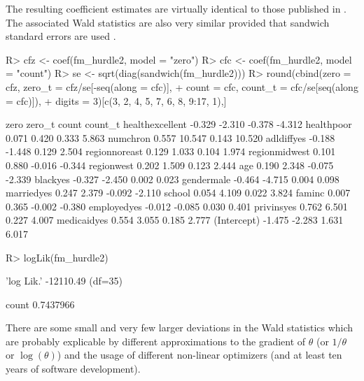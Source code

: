 \documentclass{Z}
\begin{document}
\begin{appendix}
The resulting coefficient estimates are virtually identical to those published
in \citet[p.~204]{countreg:Cameron+Trivedi:1998}. The associated Wald statistics
are also very similar provided that sandwich standard errors are used
\citet[which is not stated explicitely in][]{countreg:Cameron+Trivedi:1998}.
\begin{Schunk}
\begin{Sinput}
R> cfz <- coef(fm_hurdle2, model = "zero")
R> cfc <- coef(fm_hurdle2, model = "count")
R> se <- sqrt(diag(sandwich(fm_hurdle2)))
R> round(cbind(zero = cfz, zero_t = cfz/se[-seq(along = cfc)], 
+   count = cfc, count_t = cfc/se[seq(along = cfc)]),
+   digits = 3)[c(3, 2, 4, 5, 7, 6, 8, 9:17, 1),]
\end{Sinput}
\begin{Soutput}
                  zero zero_t  count count_t
healthexcellent -0.329 -2.310 -0.378  -4.312
healthpoor       0.071  0.420  0.333   5.863
numchron         0.557 10.547  0.143  10.520
adldiffyes      -0.188 -1.448  0.129   2.504
regionnoreast    0.129  1.033  0.104   1.974
regionmidwest    0.101  0.880 -0.016  -0.344
regionwest       0.202  1.509  0.123   2.444
age              0.190  2.348 -0.075  -2.339
blackyes        -0.327 -2.450  0.002   0.023
gendermale      -0.464 -4.715  0.004   0.098
marriedyes       0.247  2.379 -0.092  -2.110
school           0.054  4.109  0.022   3.824
faminc           0.007  0.365 -0.002  -0.380
employedyes     -0.012 -0.085  0.030   0.401
privinsyes       0.762  6.501  0.227   4.007
medicaidyes      0.554  3.055  0.185   2.777
(Intercept)     -1.475 -2.283  1.631   6.017
\end{Soutput}
\begin{Sinput}
R> logLik(fm_hurdle2)
\end{Sinput}
\begin{Soutput}
'log Lik.' -12110.49 (df=35)
\end{Soutput}
\begin{Soutput}
    count 
0.7437966 
\end{Soutput}
\end{Schunk}
There are some small and very few larger deviations in the Wald statistics
which are probably explicable by different approximations to the gradient
of $\theta$ (or $1/\theta$ or $\log(\theta)$) and the usage of different
non-linear optimizers (and at least ten years of software development).

\end{appendix}
\end{document}

